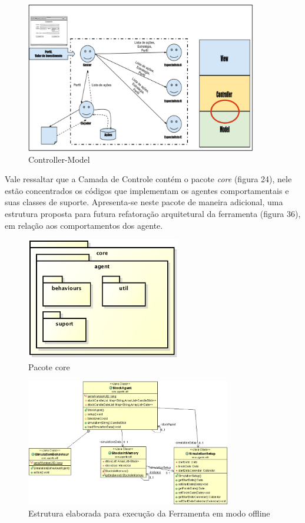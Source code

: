 \begin{figure}[h!]
\centering
\label{f18}
\includegraphics[width=0.9\textwidth]{figuras/f25}
\caption{Controller-Model}
\end{figure}
\FloatBarrier

Vale ressaltar que a Camada de Controle contém o pacote \textit{core} (figura 24), nele estão concentrados os códigos que implementam os agentes comportamentais e suas classes de suporte. Apresenta-se neste pacote de maneira adicional, uma estrutura proposta para futura refatoração arquitetural da ferramenta (figura 36), em relação aos comportamentos dos agente.

\begin{figure}[h!]
\centering
\label{f19}
\includegraphics[width=0.6\textwidth]{figuras/pacoteAgents}
\caption{Pacote core}
\end{figure}

\begin{figure}[h!]
\centering
\label{f20}
\includegraphics[width=0.8\textwidth]{figuras/classesUtil}
\caption{Estrutura elaborada para execução da Ferramenta em modo offline}
\end{figure}
\FloatBarrier

